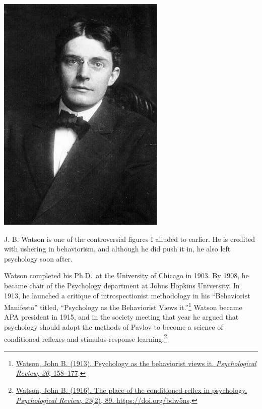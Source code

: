 \documentclass[
  oneside,
  12pt]{crumpbook}
\newenvironment{floatright25}{%
  \wrapfigure{R}{.25\textwidth}%
  }{%
  \endwrapfigure}
\begin{document}
\begin{floatright25}
\includegraphics[width=1\linewidth]{imgs/John_Broadus_Watson}

\end{floatright25}

J. B. Watson is one of the controversial figures I alluded to earlier. He is credited with ushering in behaviorism, and although he did push it in, he also left psychology soon after.

Watson completed his Ph.D.~at the University of Chicago in 1903. By 1908, he became chair of the Psychology department at Johns Hopkins University. In 1913, he launched a critique of introspectionist methodology in his ``Behaviorist Manifesto'' titled, ``Psychology as the Behaviorist Views it.''\footnote{\protect\hyperlink{ref-watsonPsychologyBehavioristViews1913}{Watson, John B. (1913). Psychology as the behaviorist views it. \emph{Psychological Review}, \emph{20}, 158--177}.} Watson became APA president in 1915, and in the society meeting that year he argued that psychology should adopt the methods of Pavlov to become a science of conditioned reflexes and stimulus-response learning.\footnote{\protect\hyperlink{ref-watsonPlaceConditionedreflexPsychology1916}{Watson, John B. (1916). The place of the conditioned-reflex in psychology. \emph{Psychological Review}, \emph{23}(2), 89. \url{https://doi.org/bdw5ns}}.}
\end{document}
